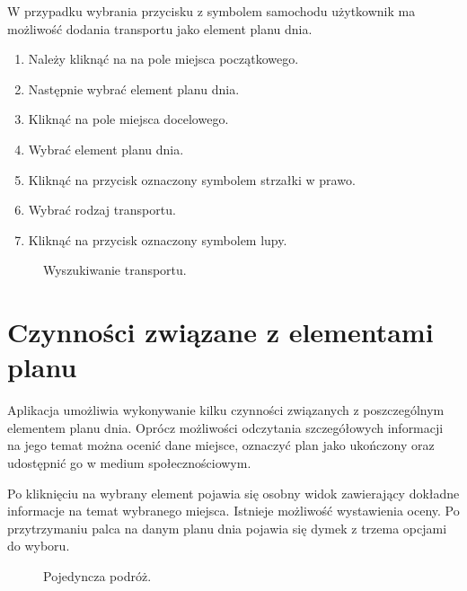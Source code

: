 W przypadku wybrania przycisku z symbolem samochodu użytkownik ma możliwość dodania transportu jako element planu dnia.
\begin{enumerate}
\item Należy kliknąć na na pole miejsca początkowego.
\item Następnie wybrać element planu dnia.
\item Kliknąć na pole miejsca docelowego.
\item Wybrać element planu dnia.
\item Kliknąć na przycisk oznaczony symbolem strzałki w prawo.
\item Wybrać rodzaj transportu.
\item Kliknąć na przycisk oznaczony symbolem lupy.
\end{enumerate}

\begin{figure}[h]

\centering
\null\hfill
{}
\hfill
{}
\hfill\null

\caption{Wyszukiwanie transportu.}
\label{fig:podrecznik12}
\end{figure}
\FloatBarrier


\section{Czynności związane z elementami planu}
Aplikacja umożliwia wykonywanie kilku czynności związanych z poszczególnym elementem planu dnia. Oprócz możliwości odczytania szczegółowych informacji na jego temat można ocenić dane miejsce, oznaczyć plan jako ukończony oraz udostępnić go w medium społecznościowym.

\par Po kliknięciu na wybrany element pojawia się osobny widok zawierający dokładne informacje na temat wybranego miejsca. Istnieje możliwość wystawienia oceny.
Po przytrzymaniu palca na danym planu dnia pojawia się dymek z trzema opcjami do wyboru.

\begin{figure}[h]

\centering
\null\hfill
{}
\hfill
{}
\hfill\null

\caption{Pojedyncza podróż.}
\label{fig:podrecznik4}
\end{figure}
\FloatBarrier

